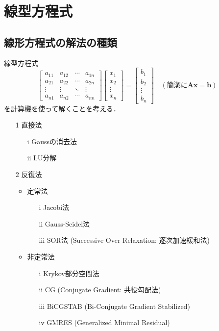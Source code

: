 \chapter{線型方程式}


\section{線形方程式の解法の種類}
線型方程式
\begin{equation}
\label{e:linearequation}
	\left[\begin{array}{cccc}
	a_{11} & a_{12} & \cdots & a_{1n}\\
	a_{21} & a_{22} & \cdots & a_{2n}\\
	\vdots & \vdots & \ddots & \vdots\\
	a_{n1} & a_{n2} & \cdots & a_{nn}
	\end{array}\right]
	\left[\begin{array}{c}
	x_1 \\ x_2 \\ \vdots \\ x_n
	\end{array}\right]=
	\left[\begin{array}{c}
	b_1 \\ b_2 \\ \vdots \\ b_n
	\end{array}\right]\quad(\text{簡潔に$\bm{A}\bm{x}=\bm{b}$})
\end{equation}
を計算機を使って解くことを考える．

\begin{itemize}
\item[1] 直接法
	\begin{itemize}
	\item[i] Gaussの消去法
	\item[ii] LU分解
	\end{itemize}
\item[2] 反復法
	\begin{itemize}
	\item 定常法
		\begin{itemize}	
		\item[i] Jacobi法
		\item[ii] Gauss-Seidel法
		\item[iii] SOR法 (Successive Over-Relaxation: 逐次加速緩和法)
		\end{itemize}
	\item 非定常法
		\begin{itemize}
		\item[i] Krykov部分空間法
		\item[ii] CG (Conjugate Gradient: 共役勾配法)
		\item[iii] BiCGSTAB (Bi-Conjugate Gradient Stabilized)
		\item[iv] GMRES (Generalized Minimal Residual)
		\end{itemize}
	\end{itemize}
\end{itemize}

